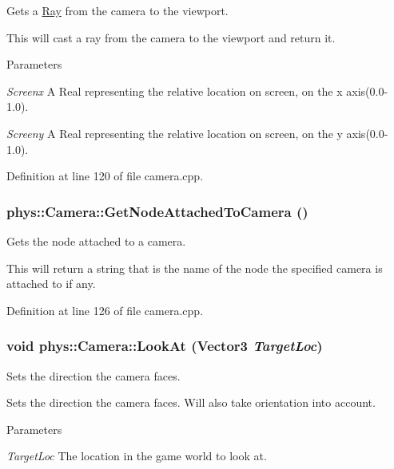 Gets a \hyperlink{classphys_1_1Ray}{Ray} from the camera to the viewport. 

This will cast a ray from the camera to the viewport and return it. 
\begin{DoxyParams}{Parameters}
\item[{\em Screenx}]A Real representing the relative location on screen, on the x axis(0.0-\/1.0). \item[{\em Screeny}]A Real representing the relative location on screen, on the y axis(0.0-\/1.0). \end{DoxyParams}


Definition at line 120 of file camera.cpp.

\hypertarget{classphys_1_1Camera_ab32a8c708e5e22f65dde9ab821ea20fc}{
\subsubsection[{GetNodeAttachedToCamera}]{ phys::Camera::GetNodeAttachedToCamera ()}}
\label{d9/df8/classphys_1_1Camera_ab32a8c708e5e22f65dde9ab821ea20fc}


Gets the node attached to a camera. 

This will return a string that is the name of the node the specified camera is attached to if any. 

Definition at line 126 of file camera.cpp.

\hypertarget{classphys_1_1Camera_a6534be5001bf06ab4c4b32a084629842}{
\subsubsection[{LookAt}]{\setlength{\rightskip}{0pt plus 5cm}void phys::Camera::LookAt ({\bf Vector3} {\em TargetLoc})}}
\label{d9/df8/classphys_1_1Camera_a6534be5001bf06ab4c4b32a084629842}


Sets the direction the camera faces. 

Sets the direction the camera faces. Will also take orientation into account. 
\begin{DoxyParams}{Parameters}
\item[{\em TargetLoc}]The location in the game world to look at. \end{DoxyParams}


